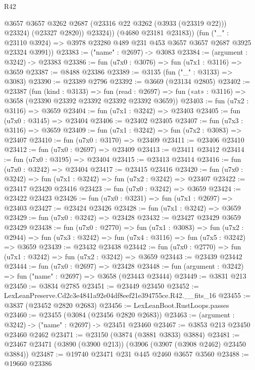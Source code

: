 \begin{lexlean}{R42}
\begin{coremodule}
                @3657
                @3657
                @3262
                @2687
                (@23316 @22 @3262 (@3933 (@23319 @22)))
                @23324)
              (@23327 @2820))
            @23324))
        (@4680 @23181 @23183))
      (fun ("_" : @23110 @3924) =>
      @3978 @23280 @489 @231 @453 @3657 @3657 @2687 @3925 @23324 @3991))
@23383 := ("name" : @2697) -> @3083
@23384 := (argument : @3242) -> @23383
@23386 := fun (u7x0 : @3076) => fun (u7x1 : @3116) => @3659
@23387 := @8488 @23386
@23389 := @3135 (fun ("_" : @3133) => @3083)
@23390 := @23389 @2796
@23392 := @3669 (@23134 @2805)
@23402 := @23387
    (fun (kind : @3133) =>
    fun (read : @2697) => fun («at» : @3116) => @3658 (@23390 @23392 @23392 @23392 @23392 @3659))
@23403 := fun (u7x2 : @3116) => @3659
@23404 := fun (u7x1 : @3242) => @23403
@23405 := fun (u7x0 : @3145) => @23404
@23406 := @23402 @23405
@23407 := fun (u7x3 : @3116) => @3659
@23409 := fun (u7x1 : @3242) => fun (u7x2 : @3083) => @23407
@23410 := fun (u7x0 : @3170) => @23409
@23411 := @23406 @23410
@23412 := fun (u7x0 : @2697) => @23409
@23413 := @23411 @23412
@23414 := fun (u7x0 : @3195) => @23404
@23415 := @23413 @23414
@23416 := fun (u7x0 : @3242) => @23404
@23417 := @23415 @23416
@23420 := fun (u7x0 : @3242) => fun (u7x1 : @3242) => fun (u7x2 : @3242) => @23407
@23422 := @23417 @23420 @23416
@23423 := fun (u7x0 : @3242) => @3659
@23424 := @23422 @23423
@23426 := fun (u7x0 : @3231) => fun (u7x1 : @2697) => @23403
@23427 := @23424 @23426
@23428 := fun (u7x1 : @3242) => @3659
@23429 := fun (u7x0 : @3242) => @23428
@23432 := @23427 @23429 @3659 @23429
@23438 := fun (u7x0 : @2770) =>
  fun (u7x1 : @3083) =>
  fun (u7x2 : @2944) => fun (u7x3 : @3242) => fun (u7x4 : @3116) => fun (u7x5 : @3242) => @3659
@23439 := @23432 @23438
@23442 := fun (u7x0 : @2770) => fun (u7x1 : @3242) => fun (u7x2 : @3242) => @3659
@23443 := @23439 @23442
@23444 := fun (u7x0 : @2697) => @23428
@23448 := fun (argument : @3242) => fun ("name" : @2697) => @3658 (@23443 @23444)
@23449 := @3831 @213
@23450 := @3834 @2785
@23451 := @23449 @23450
@23452 := LexLeanPreserve.Cd2c3e4841a92e04df8eef21e394755ce.R42.__fits_16
@23455 := @3837 (@23452 @2820 @2683)
@23456 := LexLeanBoot.RustLoops.passes
@23460 := @23455 (@3084 (@23456 @2820 @2683))
@23463 := (argument : @3242) -> ("name" : @2697) -> @23451 @23460
@23467 := @3853 @213 @23450 @23460 @2462
@23471 := @23150 (@3874 (@3881 @3833) @3884)
@23481 := @23467 @23471 (@3890 (@3900 @213)) (@3906 (@3907 (@3908 @2462) @23450 @3884))
@23487 := @19740 @23471 @231 @445 @2460 @3657 @3560
@23488 := @19660 @23386

\end{coremodule}
\end{lexlean}
